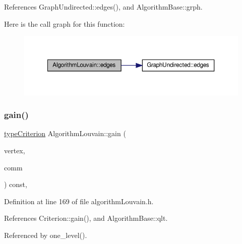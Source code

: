 References Graph\+Undirected\+::edges(), and Algorithm\+Base\+::grph.

Here is the call graph for this function\+:
\nopagebreak
\begin{figure}[H]
\begin{center}
\leavevmode
\includegraphics[width=350pt]{classAlgorithmLouvain_a6d5f1cfcbe2581bbe7bbe285392e0bdf_cgraph}
\end{center}
\end{figure}
\mbox{\label{classAlgorithmLouvain_adcd4a8dc566881f9c1b1d9e78730a503}} 
\subsubsection{\texorpdfstring{gain()}{gain()}}
{\footnotesize\ttfamily \hyperlink{criterionInterface_8h_af71ff22f6355fd69a4a62104bfd59a83}{type\+Criterion} Algorithm\+Louvain\+::gain (\begin{DoxyParamCaption}\item[{const \hyperlink{edge_8h_a5fbd20c46956d479cb10afc9855223f6}{type\+Vertex} \&}]{vertex,  }\item[{const \hyperlink{graphUndirectedGroupable_8h_a914da95c9ea7f14f4b7f875c36818556}{type\+Community} \&}]{comm }\end{DoxyParamCaption}) const\hspace{0.3cm}{\ttfamily [inline]}, {\ttfamily [private]}}



Definition at line 169 of file algorithm\+Louvain.\+h.



References Criterion\+::gain(), and Algorithm\+Base\+::qlt.



Referenced by one\+\_\+level().

